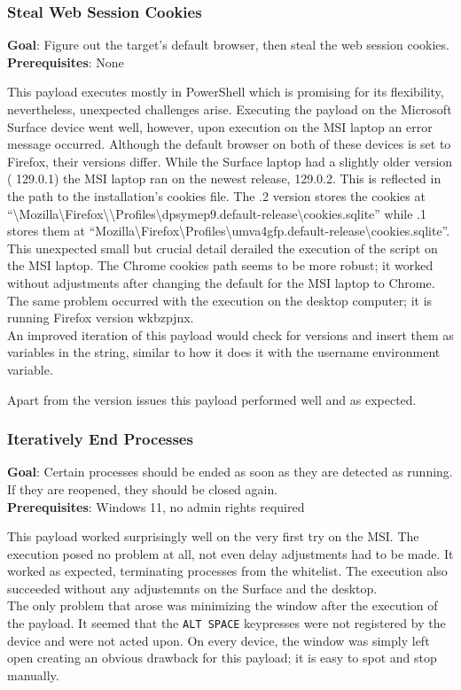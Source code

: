 \subsubsection{Steal Web Session Cookies}

\textbf{Goal}: Figure out the target's default browser, then steal the web session cookies. \\
\textbf{Prerequisites}: None

This payload executes mostly in PowerShell which is promising for its flexibility, nevertheless, unexpected challenges arise. Executing the payload on the Microsoft Surface device went well, however, upon execution on the MSI laptop an error message occurred. Although the default browser on both of these devices is set to Firefox, their versions differ. While the Surface laptop had a slightly older version ( 129.0.1) the MSI laptop ran on the newest release, 129.0.2. This is reflected in the path to the installation's cookies file. The .2 version stores the cookies at ``\textbackslash Mozilla\textbackslash Firefox\textbackslash \textbackslash Profiles\textbackslash dpsymep9.default-release\textbackslash cookies.sqlite'' while .1 stores them at ``Mozilla\textbackslash Firefox\textbackslash Profiles\textbackslash umva4gfp.default-release\textbackslash cookies.sqlite''. This unexpected small but crucial detail derailed the execution of the script on the MSI laptop. The Chrome cookies path seems to be more robust; it worked without adjustments after changing the default for the MSI laptop to Chrome. The same problem occurred with the execution on the desktop computer; it is running Firefox version wkbzpjnx. \\
An improved iteration of this payload would check for versions and insert them as variables in the string, similar to how it does it with the username environment variable. 

Apart from the version issues this payload performed well and as expected. 


\subsubsection{Iteratively End Processes}


\textbf{Goal}: Certain processes should be ended as soon as they are detected as running. If they are reopened, they should be closed again. \\
\textbf{Prerequisites}: Windows 11, no admin rights required


This payload worked surprisingly well on the very first try on the MSI. The execution posed no problem at all, not even delay adjustments had to be made. It worked as expected, terminating processes from the whitelist. The execution also succeeded without any adjustemnts on the Surface and the desktop. \\
The only problem that arose was minimizing the window after the execution of the payload. It seemed that the \verb|ALT SPACE| keypresses were not registered by the device and were not acted upon. On every device, the window was simply left open creating an obvious drawback for this payload; it is easy to spot and stop manually. 

